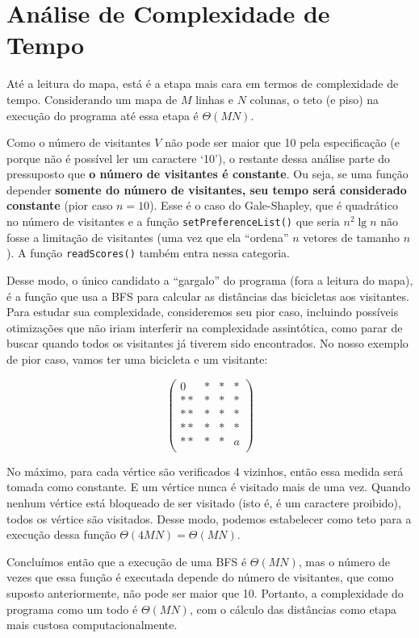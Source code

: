 \documentclass{article}
\def\code#1{\texttt{#1}}
\begin{document}
\section{Análise de Complexidade de Tempo}

Até a leitura do mapa, está é a etapa mais cara em termos de complexidade de tempo. Considerando um mapa de \( M \) linhas e \( N\) colunas, o teto (e piso) na execução do programa até essa etapa é \( \Theta(MN) \).

Como o número de visitantes \( V \) não pode ser maior que 10 pela especificação (e porque não é possível ler um caractere `10'), o restante dessa análise parte do pressuposto que \textbf{o número de visitantes é constante}. Ou seja, se uma função depender \textbf{somente do número de visitantes, seu tempo será considerado constante} (pior caso \( n = 10 \)). Esse é o caso do Gale-Shapley, que é quadrático no número de visitantes e a função \code{setPreferenceList()} que seria \( n^2 \lg n \) não fosse a limitação de visitantes (uma vez que ela ``ordena'' \( n \) vetores de tamanho \( n \)). A função \code{readScores()} também entra nessa categoria.

Desse modo, o único candidato a ``gargalo'' do programa (fora a leitura do mapa), é a função que usa a BFS para calcular as distâncias das bicicletas aos visitantes. Para estudar sua complexidade, consideremos seu pior caso, incluindo possíveis otimizações que não iriam interferir na complexidade assintótica, como parar de buscar quando todos os visitantes já tiverem sido encontrados. No nosso exemplo de pior caso, vamos ter uma bicicleta e um visitante:

\begin{equation}
	\left(\begin{array}{cccc}
		0  & * & * & * \\
		** & * & * & * \\
		** & * & * & * \\
		** & * & * & * \\
		** & * & * & a \\
	\end{array}\right)
\end{equation}

No máximo, para cada vértice são verificados 4 vizinhos, então essa medida será tomada como constante. E um vértice nunca é visitado mais de uma vez. Quando nenhum vértice está bloqueado de ser visitado (isto é, é um caractere proibido), todos os vértice são visitados. Desse modo, podemos estabelecer como teto para a execução dessa função \( \Theta(4MN) = \Theta(MN) \).

Concluímos então que a execução de uma BFS é \( \Theta(MN) \), mas o número de vezes que essa função é executada depende do número de visitantes, que como suposto anteriormente, não pode ser maior que 10. Portanto, a complexidade do programa como um todo é \( \Theta(MN) \), com o cálculo das distâncias como etapa mais custosa computacionalmente.
\end{document}
